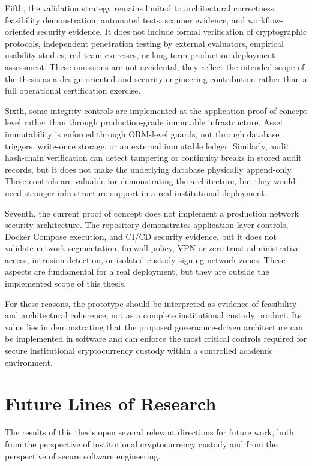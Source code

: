 \documentclass[12pt,a4paper]{report}
\begin{document}
Fifth, the validation strategy remains limited to architectural correctness, feasibility demonstration, automated tests, scanner evidence, and workflow-oriented security evidence. It does not include formal verification of cryptographic protocols, independent penetration testing by external evaluators, empirical usability studies, red-team exercises, or long-term production deployment assessment. These omissions are not accidental; they reflect the intended scope of the thesis as a design-oriented and security-engineering contribution rather than a full operational certification exercise.

Sixth, some integrity controls are implemented at the application proof-of-concept level rather than through production-grade immutable infrastructure. Asset immutability is enforced through ORM-level guards, not through database triggers, write-once storage, or an external immutable ledger. Similarly, audit hash-chain verification can detect tampering or continuity breaks in stored audit records, but it does not make the underlying database physically append-only. These controls are valuable for demonstrating the architecture, but they would need stronger infrastructure support in a real institutional deployment.

Seventh, the current proof of concept does not implement a production network security architecture. The repository demonstrates application-layer controls, Docker Compose execution, and CI/CD security evidence, but it does not validate network segmentation, firewall policy, VPN or zero-trust administrative access, intrusion detection, or isolated custody-signing network zones. These aspects are fundamental for a real deployment, but they are outside the implemented scope of this thesis.

For these reasons, the prototype should be interpreted as evidence of feasibility and architectural coherence, not as a complete institutional custody product. Its value lies in demonstrating that the proposed governance-driven architecture can be implemented in software and can enforce the most critical controls required for secure institutional cryptocurrency custody within a controlled academic environment.

\section{Future Lines of Research}
\label{sec:futureWork}

The results of this thesis open several relevant directions for future work, both from the perspective of institutional cryptocurrency custody and from the perspective of secure software engineering.
\end{document}
